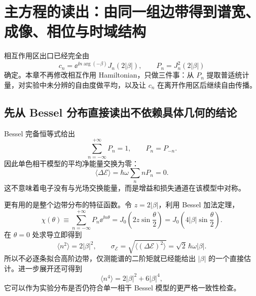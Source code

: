 \chapter{主方程的读出：由同一组边带得到谱宽、成像、相位与时域结构}
\label{chap:downstream-observables}
\label{chap:observables}

相互作用区出口已经完全由
\begin{equation}
\boxed{
 c_n=\ee^{\ii n\arg(-\beta)}J_n(2|\beta|),
 \qquad
 P_n=J_n^2(2|\beta|)}
\label{eq:downstream-master-response}
\end{equation}
确定。本章不再修改相互作用 Hamiltonian，只做三件事：从 \(P_n\) 提取普适统计量，对实验中未分辨的自由度做平均，以及让 \(c_n\) 在离开作用区后继续自由传播。

\section{先从 Bessel 分布直接读出不依赖具体几何的结论}

Bessel 完备恒等式给出
\begin{equation}
\sum_{n=-\infty}^{+\infty}P_n=1,
\qquad
P_n=P_{-n}.
\end{equation}
因此单色相干模型的平均净能量交换为零：
\begin{equation}
\boxed{\langle\Delta\mathcal E\rangle
=\hbar\omega\sum_n nP_n=0.}
\label{eq:mean-energy-zero}
\end{equation}
这不意味着电子没有与光场交换能量，而是增益和损失通道在该模型中对称。

更有用的是整个边带分布的特征函数。令 \(z=2|\beta|\)，利用 Bessel 加法定理，
\begin{equation}
\boxed{
\chi(\theta)
\equiv\sum_{n=-\infty}^{+\infty}P_n\ee^{\ii n\theta}
=J_0\!\left(2z\sin\frac{\theta}{2}\right)
=J_0\!\left(4|\beta|\sin\frac{\theta}{2}\right).}
\label{eq:bessel-characteristic-function}
\end{equation}
在 \(\theta=0\) 处求导立即得到
\begin{equation}
\boxed{
\langle n^2\rangle=2|\beta|^2,
\qquad
\sigma_{\mathcal E}
=\sqrt{\langle(\Delta\mathcal E)^2\rangle}
=\sqrt2\,\hbar\omega|\beta|.}
\label{eq:energy-variance-beta}
\end{equation}
所以不必逐条拟合高阶边带，仅测能谱的二阶矩就已经能给出 \(|\beta|\) 的一个直接估计。进一步展开还可得到
\begin{equation}
\langle n^4\rangle=2|\beta|^2+6|\beta|^4,
\end{equation}
它可以作为实验分布是否仍符合单一相干 Bessel 模型的更严格一致性检查。

